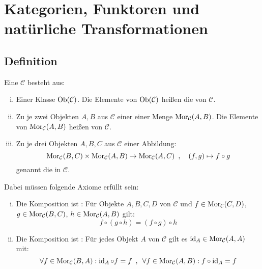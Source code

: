 
\newcommand{\fach}{Topologie \RM{1}.}
\newcommand{\semester}{WiSe 2014/2015}
\newcommand{\homepage}{https://wwwmath.uni-muenster.de/reine/u/topos/lehre/WS2014-2015/Topologie1/Topologie1.html}

\newcommand{\prof}{Prof.\,Dr.\,Arthur Bartels}



\maketitle
\begin{abstract}

\end{abstract}

\setcounter{page}{1}
\tableofcontents
\cleardoubleoddemptypage

\setcounter{page}{1}

\section{Kategorien, Funktoren und natürliche Transformationen} %
\label{sec:1}

\subsection[Definition: Kategorie]{Definition} %
\label{sub:11}
Eine  $\mathcal{C}$ besteht aus: 
\begin{enumerate}[i)]
	\item Einer Klasse $\operatorname{Ob}(\mathcal{C})$. Die Elemente von $\operatorname{Ob}(\mathcal{C})$ heißen die  von $\mathcal{C}$.
	\item Zu je zwei Objekten $A,B$ aus $\mathcal{C}$ einer einer Menge $\operatorname{Mor}_{\mathcal{C}}(A,B)$. Die Elemente von $\operatorname{Mor}_\mathcal{C}(A,B)$ heißen  von
	$\mathcal{C}$.
	\item Zu je drei Objekten $A,B,C$ aus $\mathcal{C}$ einer Abbildung: 
	\[
		\operatorname{Mor}_\mathcal{C}(B,C) \times \operatorname{Mor}_\mathcal{C}(A,B) \to \operatorname{Mor}_\mathcal{C}(A,C) \enspace, \quad (f,g) \mapsto f \circ g
	\]
	genannt die  in $\mathcal{C}$. 
\end{enumerate}
Dabei müssen folgende Axiome  erfüllt sein:
\begin{enumerate}[(i)]
	\item Die Komposition ist : Für Objekte $A,B,C,D$ von $\mathcal{C}$ und $f \in \operatorname{Mor}_\mathcal{C}(C,D)$, $g \in \operatorname{Mor}_\mathcal{C}(B,C)$, 
	$h \in \operatorname{Mor}_\mathcal{C}(A,B)$ gilt:
	\[
		f \circ (g \circ h) = (f \circ g) \circ h
	\]
	\item Die Komposition ist : Für jedes Objekt $A$ von $\mathcal{C}$ gilt es $\operatorname{id}_A \in \operatorname{Mor}_\mathcal{C}(A,A)$ mit:
	\[
		\forall f \in \operatorname{Mor}_\mathcal{C}(B,A) : \operatorname{id}_A \circ f = f  \enspace , \enspace \forall f \in \operatorname{Mor}_\mathcal{C}(A,B) : f \circ \operatorname{id}_A = f
	\]
\end{enumerate}

